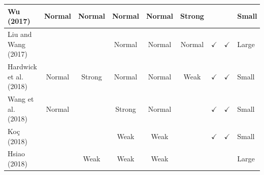 \documentclass[../access.tex]{subfiles}
\begin{document}
\begin{table}[htbp]
\begin{adjustwidth}{-1cm}{}
\begin{tabular}{m{4.4cm} c c c c c c c >{\centering\arraybackslash}m{0.7cm}}
            \hline
            \footnotesize{Wu (2017) \cite{Wu2017}}                              & {Normal}                                                                                          & {Normal}                                         & {Normal}               & {Normal}                     & {Strong}                  & {}                      & {}                        & \footnotesize{Small} \\
            \hline
            \footnotesize{Liu and Wang (2017) \cite{Liu2017}}                   & {}                                                                                                & {}                                               & {Normal}               & {Normal}                     & {Normal}                  & $ \checkmark $          & $ \checkmark $            & \footnotesize{Large} \\
            \hline
            \footnotesize{Hardwick et al. (2018) \cite{Hardwick2018}}           & {Normal}                                                                                          & {Strong}                                         & {Normal}               & {Normal}                     & {Weak}                    & $ \checkmark $          & $ \checkmark $            & \footnotesize{Small} \\
            \hline
            \footnotesize{Wang et al. (2018) \cite{Wang2018}}                   & {Normal}                                                                                          & {}                                               & {Strong}               & {Normal}                     & {}                        & $ \checkmark $          & $ \checkmark $            & \footnotesize{Small} \\
            \hline
            \footnotesize{Ko\c{c} (2018) \cite{Koc2018}}                        & {}                                                                                                & {}                                               & {Weak}                 & {Weak}                       & {}                        & $ \checkmark $          & $ \checkmark $            & \footnotesize{Small} \\
            \hline
            \footnotesize{Hsiao (2018) \cite{Hsiao2018}}                        & {}                                                                                                & {Weak}                                           & {Weak}                 & {Weak}                       & {}                        & {}                      & {}                        & \footnotesize{Large} \\

\end{tabular}
\end{adjustwidth}
\end{table}
\end{document}
